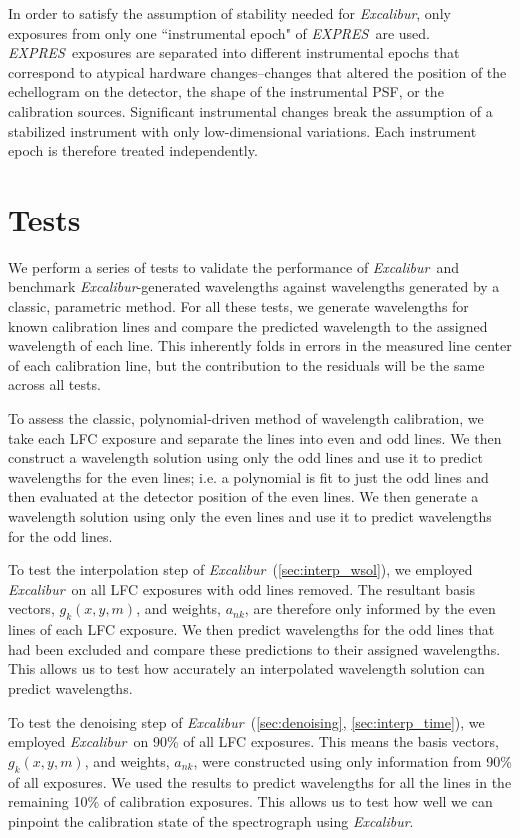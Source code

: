\documentclass[12pt, onecolumn]{aastex63}
\newcommand{\project}[1]{\textsl{#1}}
\newcommand{\name}{\project{Excalibur}}
\newcommand{\acronym}[1]{{\small{#1}}}
\newcommand{\expres}{\project{\acronym{EXPRES}}}
\begin{document}
In order to satisfy the assumption of stability needed for \name, only exposures from only one ``instrumental epoch" of \expres\ are used.  \expres\ exposures are separated into different instrumental epochs that correspond to atypical hardware changes--changes that altered the position of the echellogram on the detector, the shape of the instrumental PSF, or the calibration sources.  Significant instrumental changes break the assumption of a stabilized instrument with only low-dimensional variations.  Each instrument epoch is therefore treated independently.


\section{Tests}\label{sec:tests}
We perform a series of tests to validate the performance of \name\ and benchmark \name -generated wavelengths against wavelengths generated by a classic, parametric method.  For all these tests, we generate wavelengths for known calibration lines and compare the predicted wavelength to the assigned wavelength of each line.  This inherently folds in errors in the measured line center of each calibration line, but the contribution to the residuals will be the same across all tests.

To assess the classic, polynomial-driven method of wavelength calibration, we take each LFC exposure and separate the lines into even and odd lines.  We then construct a wavelength solution using only the odd lines and use it to predict wavelengths for the even lines; i.e. a polynomial is fit to just the odd lines and then evaluated at the detector position of the even lines.  We then generate a wavelength solution using only the even lines and use it to predict wavelengths for the odd lines.

To test the interpolation step of \name\ (\textsection \ref{sec:interp_wsol}), we employed \name\ on all LFC exposures with odd lines removed.  The resultant basis vectors, $g_k(x,y,m)$,  and weights, $a_{nk}$, are therefore only informed by the even lines of each LFC exposure.  We then predict wavelengths for the odd lines that had been excluded and compare these predictions to their assigned wavelengths.  This allows us to test how accurately an interpolated wavelength solution can predict wavelengths.

To test the denoising step of \name\ (\textsection \ref{sec:denoising}, \textsection\ref{sec:interp_time}), we employed \name\ on 90\% of all LFC exposures.  This means the basis vectors, $g_k(x,y,m)$,  and weights, $a_{nk}$, were constructed using only information from 90\% of all exposures.  We used the results to predict wavelengths for all the lines in the remaining 10\% of calibration exposures.  This allows us to test how well we can pinpoint the calibration state of the spectrograph using \name.
\end{document}
